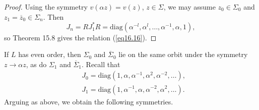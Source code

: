 \documentclass{surv-l}
\theoremstyle{plain}
\theoremstyle{definition}
\numberwithin{equation}{chapter}
\begin{document}
\begin{proof}
Using the symmetry $v(\alpha z)=v(z)$, $ z\in\Sigma$, we may assume $z_{0}\in\Sigma_{0}$ and $z_{1}=\overline{z}_{0}\in\Sigma_{n}$. Then
\begin{equation*}
J_{n}=RJ_{1}^{*}R= \mathrm{diag}(\alpha^{-l}, \alpha^{l}, \ldots, \alpha^{-1}, \alpha, 1),
\end{equation*}
so Theorem 15.8 gives the relation (\ref{eq16.16}).
\end{proof}
If $L$ has even order, then $\Sigma_{0}$ and $\overline{\Sigma}_{0}$ lie on the same orbit under the symmetry $z\rightarrow\alpha z$, as do $\Sigma_{1}$ and $\overline{\Sigma}_{1}$. Recall that
\begin{align*}
&J_{0}= \mathrm{diag} (1, \alpha, \alpha^{-1}, \alpha^{2},\alpha^{-2}, \ldots) ,\\
&J_{1}= \mathrm{diag} (1,\alpha^{-1},\alpha, \alpha^{-2}, \alpha^{2},\ldots).
\end{align*}
Arguing as above, we obtain the following symmetries.
\setcounter{theorem}{16}
\end{document}
